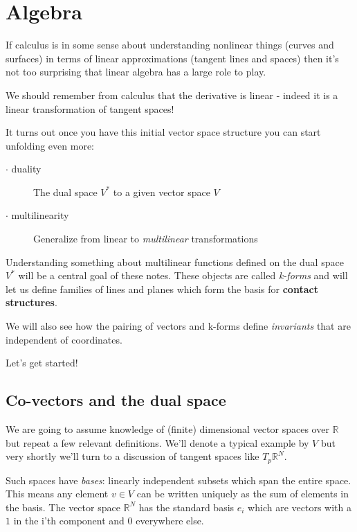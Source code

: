 \documentclass{article}
\begin{document}
\section {Algebra}

If calculus is in some sense about understanding nonlinear things (curves and
surfaces) in terms of linear approximations (tangent lines and spaces) then it's
not too surprising that linear algebra has a large role to play.

We should remember from calculus that the derivative is linear - indeed it is a
linear transformation of tangent spaces!

It turns out once you have this initial vector space structure you can start
unfolding even more:

\begin{description}
\item[$\cdot$ duality       ] The dual space $V^{*}$ to a given vector space $V$
\item[$\cdot$ multilinearity] Generalize from linear to \textsl{multilinear} transformations 
\end{description}

Understanding something about multilinear functions defined on the dual space
$V^{*}$ will be a central goal of these notes. These objects are called
\textsl{k-forms} and will let us define families of lines and planes which form
the basis for \textbf{contact structures}.

We will also see how the pairing of vectors and k-forms define
\textsl{invariants} that are independent of coordinates.

Let's get started!

\subsection {Co-vectors and the dual space}

We are going to assume knowledge of (finite) dimensional vector spaces over
$\mathbb{R}$ but repeat a few relevant definitions. We'll
denote a typical example by $V$ but very shortly we'll turn to a discussion of
tangent spaces like $T_{p}\mathbb{R}^{N}$.

Such spaces have \textsl{bases}: linearly independent subsets which span the
entire space. This means any element $v \in V$ can be written uniquely as the
sum of elements in the basis. The vector space $\mathbb{R}^{N}$ has the standard basis $e_{i}$
which are vectors with a $1$ in the i'th component and $0$ everywhere else.
\end{document}
